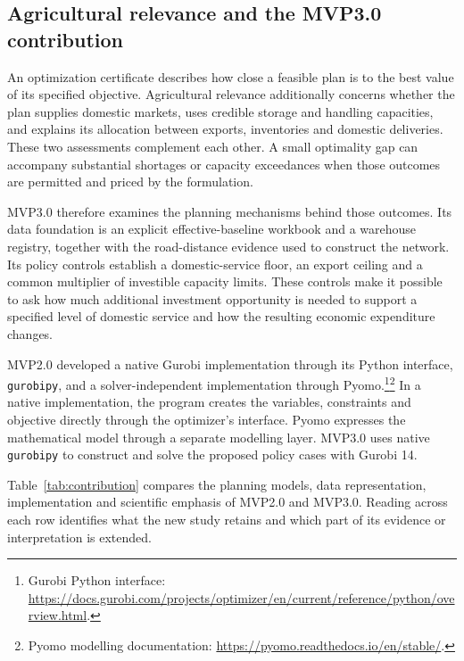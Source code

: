 \documentclass[11pt,a4paper]{article}
\newcommand{\code}[1]{{\small\texttt{#1}}}
\newcommand{\technical}[2]{\footnote{#1: \url{#2}.}}
\begin{document}
\subsection{Agricultural relevance and the MVP3.0 contribution}

An optimization certificate describes how close a feasible plan is to the best value of its specified objective. Agricultural relevance additionally concerns whether the plan supplies domestic markets, uses credible storage and handling capacities, and explains its allocation between exports, inventories and domestic deliveries. These two assessments complement each other. A small optimality gap can accompany substantial shortages or capacity exceedances when those outcomes are permitted and priced by the formulation.

MVP3.0 therefore examines the planning mechanisms behind those outcomes. Its data foundation is an explicit effective-baseline workbook and a warehouse registry, together with the road-distance evidence used to construct the network. Its policy controls establish a domestic-service floor, an export ceiling and a common multiplier of investible capacity limits. These controls make it possible to ask how much additional investment opportunity is needed to support a specified level of domestic service and how the resulting economic expenditure changes.

MVP2.0 developed a native Gurobi implementation through its Python interface, \code{gurobipy}, and a solver-independent implementation through Pyomo.\technical{Gurobi Python interface}{https://docs.gurobi.com/projects/optimizer/en/current/reference/python/overview.html}\technical{Pyomo modelling documentation}{https://pyomo.readthedocs.io/en/stable/} In a native implementation, the program creates the variables, constraints and objective directly through the optimizer's interface. Pyomo expresses the mathematical model through a separate modelling layer. MVP3.0 uses native \code{gurobipy} to construct and solve the proposed policy cases with Gurobi 14.

Table~\ref{tab:contribution} compares the planning models, data representation, implementation and scientific emphasis of MVP2.0 and MVP3.0. Reading across each row identifies what the new study retains and which part of its evidence or interpretation is extended.
\end{document}
